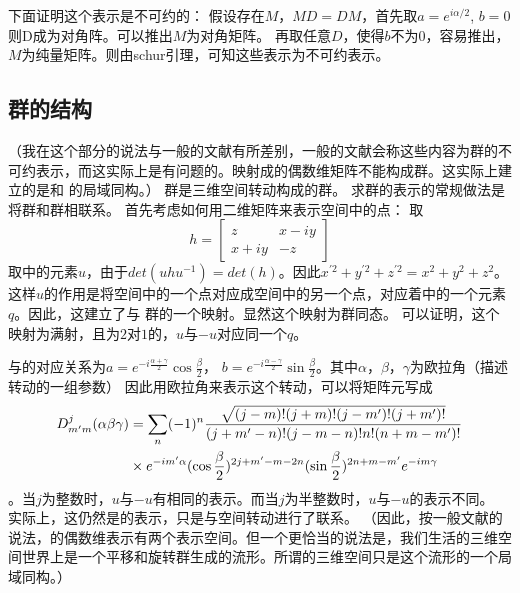 下面证明这个表示是不可约的：
假设存在$M$，$MD = DM$，首先取$a= e^{i\alpha/2}$, $b=0$则D成为对角阵。可以推出$M$为对角矩阵。
再取任意$D$，使得$b$不为$0$，容易推出，$M$为纯量矩阵。则由schur引理，可知这些表示为不可约表示。

\subsection{\sothree 群的结构}
（我在这个部分的说法与一般的文献有所差别，一般的文献会称这些内容为\sothree 群的不可约表示，而这实际上是有问题的。\sothree 映射成的偶数维矩阵不能构成群。这实际上建立的是\sothree 和 \sutwo 的局域同构。）
\sothree 群是三维空间转动构成的群。
求\sothree 群的表示的常规做法是将\sothree 群和\sutwo 群相联系。
首先考虑如何用二维矩阵来表示空间中的点：
取
\begin{displaymath}
h=\begin{bmatrix}
z & x - i y \\ 
x + i y & -z
\end{bmatrix} 
\end{displaymath}
取\sutwo 中的元素$u$，由于$det(uhu^{-1}) = det(h)$。因此$x^{\prime2}+y^{\prime2}+z^{\prime2} = x^2 + y^2 + z^2$。
这样$u$的作用是将空间中的一个点对应成空间中的另一个点，对应着\sothree 中的一个元素$q$。因此，这建立了\sutwo 与 \sothree 群的一个映射。显然这个映射为群同态。
可以证明，这个映射为满射，且为$2$对$1$的，$u$与$-u$对应同一个$q$。

\sutwo 与\sothree 的对应关系为$a=e^{-i\frac{\alpha+\gamma}{2}}\cos \frac{\beta}{2}$，
$b=e^{-i\frac{\alpha-\gamma}{2}}\sin \frac{\beta}{2}$。其中$\alpha$，$\beta$，$\gamma$为欧拉角（描述转动的一组参数）
因此用欧拉角来表示这个转动，可以将矩阵元写成
\begin{displaymath}
\begin{split}
D^j_{{m^{\prime}} m}(\alpha\beta\gamma) &= \sum_n (-1)^n \frac{\sqrt{(j-m)!(j+m)!(j-{m^{\prime}})!(j+{m^{\prime}})!}}
{(j+{m^{\prime}}-n)!(j-m-n)!n!(n+m-{m^{\prime}})!} \\
&\times e^{-i{m^{\prime}}\alpha} (\cos \frac{\beta}{2})^{2j+{m^{\prime}}-m-2 n}(\sin \frac \beta 2)^{2n + m - {m^{\prime}}} e^{-im \gamma}
\end{split}
\end{displaymath} 。当$j$为整数时，$u$与$-u$有相同的表示。而当$j$为半整数时，$u$与$-u$的表示不同。
实际上，这仍然是\sutwo 的表示，只是与空间转动进行了联系。
（因此，按一般文献的说法，\sothree 的偶数维表示有两个表示空间。但一个更恰当的说法是，我们生活的三维空间世界上是一个平移和\sutwo 旋转群生成的流形。所谓的三维空间只是这个流形的一个局域同构。）

